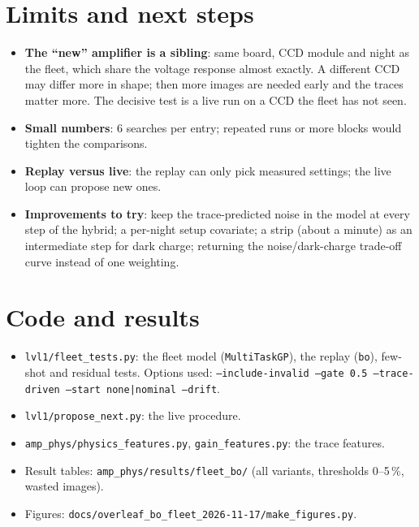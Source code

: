 \documentclass[11pt]{article}
\begin{document}
\section{Limits and next steps}
\begin{itemize}
\item \textbf{The ``new'' amplifier is a sibling}: same board, CCD module and night as the fleet, which share the voltage
  response almost exactly. A different CCD may differ more in shape; then more images are needed early and the traces
  matter more. The decisive test is a live run on a CCD the fleet has not seen.
\item \textbf{Small numbers}: 6 searches per entry; repeated runs or more blocks would tighten the comparisons.
\item \textbf{Replay versus live}: the replay can only pick measured settings; the live loop can propose new ones.
\item \textbf{Improvements to try}: keep the trace-predicted noise in the model at every step of the hybrid; a per-night
  setup covariate; a strip (about a minute) as an intermediate step for dark charge; returning the noise/dark-charge
  trade-off curve instead of one weighting.
\end{itemize}

\appendix
\section{Code and results}
\begin{itemize}
\item \texttt{lvl1/fleet\_tests.py}: the fleet model (\texttt{MultiTaskGP}), the replay (\texttt{bo}), few-shot and
  residual tests. Options used: \texttt{--include-invalid --gate 0.5 --trace-driven --start none|nominal --drift}.
\item \texttt{lvl1/propose\_next.py}: the live procedure.
\item \texttt{amp\_phys/physics\_features.py}, \texttt{gain\_features.py}: the trace features.
\item Result tables: \texttt{amp\_phys/results/fleet\_bo/} (all variants, thresholds 0--5\,\%, wasted images).
\item Figures: \texttt{docs/overleaf\_bo\_fleet\_2026-11-17/make\_figures.py}.
\end{itemize}
\end{document}
